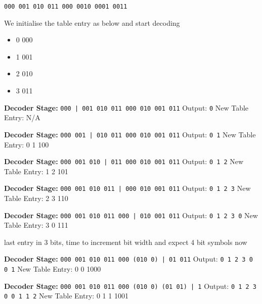 \documentclass[12pt]{article}
\begin{document}
\texttt{\color{blue}000 001 010 011 000 0010 0001 0011}

We initialise the table entry as below and start decoding
\begin{itemize}[topsep=0pt]\itemsep-0.6em 
    \item 0 \textrightarrow{}000
    \item 1 \textrightarrow{}001
    \item 2 \textrightarrow{}010
    \item 3 \textrightarrow{}011
\end{itemize}

\textbf{Decoder Stage:} \texttt{000 | 001 010 011 000 010 001 011}
\newline Output: \texttt{0}
\newline New Table Entry: N/A

\textbf{Decoder Stage:} \texttt{000 001 | 010 011 000 010 001 011}
\newline Output: \texttt{0 1}
\newline New Table Entry: 0 1 \textrightarrow{} 100

\textbf{Decoder Stage:} \texttt{000 001 010 | 011 000 010 001 011}
\newline Output: \texttt{0 1 2}
\newline New Table Entry: 1 2 \textrightarrow{} 101

\textbf{Decoder Stage:} \texttt{000 001 010 011 | 000 010 001 011}
\newline Output: \texttt{0 1 2 3}
\newline New Table Entry: 2 3 \textrightarrow{} 110

\textbf{Decoder Stage:} \texttt{000 001 010 011 000 | 010 001 011}
\newline Output: \texttt{0 1 2 3 0}
\newline New Table Entry: 3 0 \textrightarrow{} 111

{\color{red} last entry in 3 bits, time to increment bit width and expect 4 bit symbols now}

\textbf{Decoder Stage:} \texttt{000 001 010 011 000 {\color{red}(010 0)} | 01 011}
\newline Output: \texttt{0 1 2 3 0 {\color{red}0 1}}
\newline New Table Entry: 0 0 \textrightarrow{} 1000

\textbf{Decoder Stage:} \texttt{000 001 010 011 000 (010 0) {\color{red}(01 01)} | 1}
\newline Output: \texttt{0 1 2 3 0 0 1 {\color{red}1 2}}
\newline New Table Entry: 0 1 1 \textrightarrow{} 1001
\end{document}
